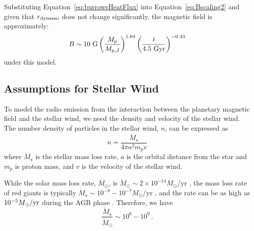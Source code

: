 \documentclass[iop,numberedappendix,apj]{emulateapj}
\begin{document}
Substituting Equation~\ref{eq:burrowsHeatFlux} into Equation~\ref{eq:Bscaling2} and given that $r_{\rm dynamo} $ does not change significantly, the magnetic field is approximately:
\begin{equation}
B   \sim   10~{\rm G} \left( \frac{M_p }{M_{p,J}} \right)^{1.04} \left( \frac{t}{4.5~\rm{Gyr}} \right)^{-0.43} \label{eq:scalingB}
\end{equation}
under this model. 





\subsection{Assumptions for Stellar Wind}
\label{ss:stellarwind}

To model the radio emission from the interaction between the planetary magnetic field and the stellar wind,
we need the density and velocity of the stellar wind. 
The number density of particles in the stellar wind, $n$, can be expressed as
\begin{equation}
n = \frac{\dot M_\star}{4\pi a^2 m_p v}
\label{eq:n}
\end{equation}
where $\dot M_\star$ is the stellar mass loss rate, $a$ is the orbital distance from the star and $m_p$ is proton mass, and $v$ is the velocity of the stellar wind. 

While the solar mass loss rate, $\dot M_\odot$, is $\dot M_\odot \sim 2\times 10^{-14} M_{\odot}$/yr \citep[e.g.,][]{hundhausen1997}, the mass loss rate of red giants is typically $\dot M_\star \sim 10^{-8}-10^{-7} M_{\odot}$/yr \citep{reimers1975}, and the rate can be as high as $10^{-5} M_\odot{\rm /yr}$ during the AGB phase \citep{schild1989, vassiliadis1993, schoier2001, vanloon2005}.
Therefore, we have
\begin{equation}
\frac{\dot M_\star}{\dot M_{\odot}} \sim 10^6 - 10^9 \, . \label{eq:scale_Mdot}
\end{equation}
\end{document}
